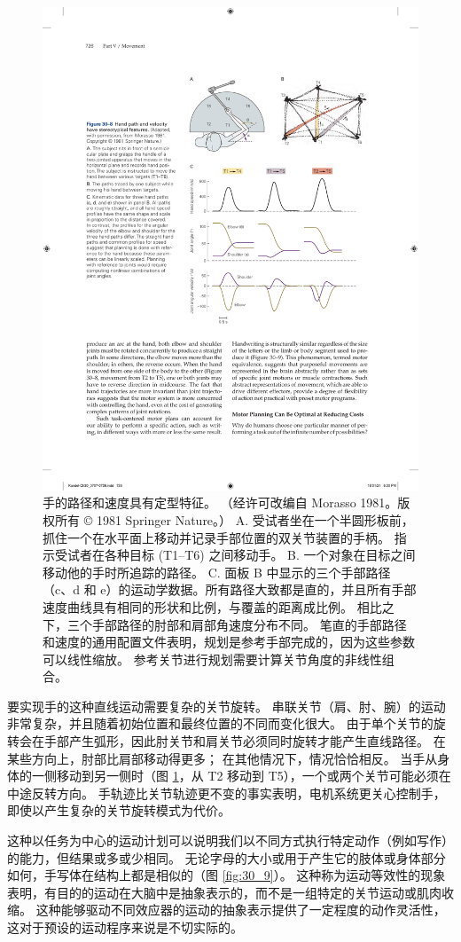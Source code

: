 \begin{figure}[htbp]
	\centering
	\includegraphics[width=0.7\linewidth]{chap30/fig_30_8}
	\caption{手的路径和速度具有定型特征。 （经许可改编自 Morasso 1981。版权所有 © 1981 Springer Nature。） A. 受试者坐在一个半圆形板前，抓住一个在水平面上移动并记录手部位置的双关节装置的手柄。 指示受试者在各种目标 (T1–T6) 之间移动手。 B. 一个对象在目标之间移动他的手时所追踪的路径。 C. 面板 B 中显示的三个手部路径（c、d 和 e）的运动学数据。所有路径大致都是直的，并且所有手部速度曲线具有相同的形状和比例，与覆盖的距离成比例。 相比之下，三个手部路径的肘部和肩部角速度分布不同。 笔直的手部路径和速度的通用配置文件表明，规划是参考手部完成的，因为这些参数可以线性缩放。 参考关节进行规划需要计算关节角度的非线性组合。}
	\label{fig:30_8}
\end{figure}

要实现手的这种直线运动需要复杂的关节旋转。 
串联关节（肩、肘、腕）的运动非常复杂，并且随着初始位置和最终位置的不同而变化很大。
由于单个关节的旋转会在手部产生弧形，因此肘关节和肩关节必须同时旋转才能产生直线路径。
在某些方向上，肘部比肩部移动得更多；
在其他情况下，情况恰恰相反。
当手从身体的一侧移动到另一侧时（图 \ref{fig:30_8}，从 T2 移动到 T5），一个或两个关节可能必须在中途反转方向。
手轨迹比关节轨迹更不变的事实表明，电机系统更关心控制手，即使以产生复杂的关节旋转模式为代价。


这种以任务为中心的运动计划可以说明我们以不同方式执行特定动作（例如写作）的能力，但结果或多或少相同。 
无论字母的大小或用于产生它的肢体或身体部分如何，手写体在结构上都是相似的（图 \ref{fig:30_9}）。 
这种称为运动等效性的现象表明，有目的的运动在大脑中是抽象表示的，而不是一组特定的关节运动或肌肉收缩。
这种能够驱动不同效应器的运动的抽象表示提供了一定程度的动作灵活性，这对于预设的运动程序来说是不切实际的。


